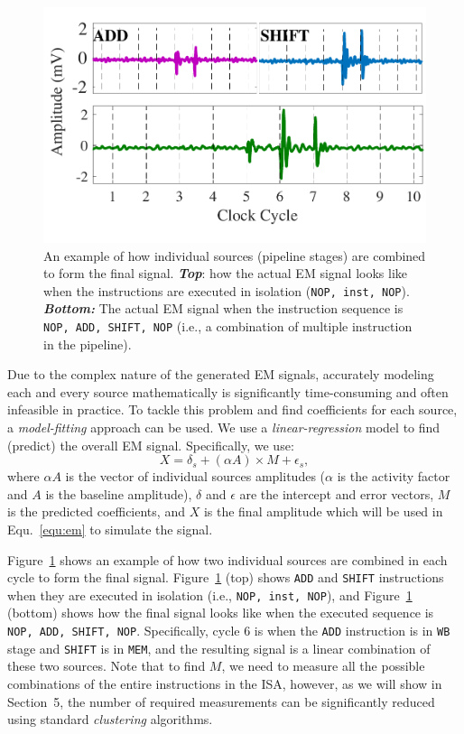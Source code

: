 \documentclass[11 pt]{article}
\begin{document}
\begin{figure}
	\centering	
	\includegraphics[width=0.4\columnwidth]{figure/miso.pdf}
	\caption{An example of how individual sources (pipeline stages) are combined to form the final signal. \textbf{\textit{Top}}: how the actual EM signal looks like when the instructions are executed in isolation ({\tt NOP, inst, NOP}). \textbf{\textit{Bottom:}} The actual EM signal when the instruction sequence is {\tt NOP, ADD, SHIFT, NOP} (i.e., a combination of multiple instruction in the pipeline).}
	\label{fig:miso}
	\vspace{-3mm}
\end{figure}

Due to the complex nature of the generated EM signals, accurately modeling each and every source mathematically  is significantly time-consuming and often infeasible in practice.
To tackle this problem and find coefficients for each source, a \textit{model-fitting} approach can be used. We use a \textit{linear-regression} model to find (predict) the overall EM signal. Specifically, we use:
\begin{equation}
X = \delta_s + (\alpha A)\times M + \epsilon_s,
\label{equ:miso}
\end{equation}
where $\alpha A$ is the vector of individual sources amplitudes ($\alpha$ is the activity factor and $A$ is the baseline amplitude), $\delta$ and $\epsilon$ are the intercept and error vectors, $M$ is the predicted coefficients, and $X$ is the final amplitude which will be used in Equ.~\ref{equ:em} to simulate the signal.

Figure~\ref{fig:miso} shows an example of how two individual sources are combined in each cycle to form the final signal. Figure~\ref{fig:miso} (top) shows {\tt ADD} and {\tt SHIFT} instructions when they are executed in isolation (i.e., {\tt NOP, inst, NOP}), and Figure~\ref{fig:miso} (bottom) shows how the final signal looks like when the executed sequence is {\tt NOP, ADD, SHIFT, NOP}. Specifically, cycle 6 is when the {\tt ADD} instruction is in {\tt WB} stage and {\tt SHIFT} is in {\tt MEM}, and the resulting signal is a linear combination of these two sources.  Note that to find $M$, we need to measure all the possible combinations of the entire instructions in the ISA, however, as we will show in Section~5, the number of required measurements can be significantly reduced using standard \textit{clustering} algorithms.
\end{document}
